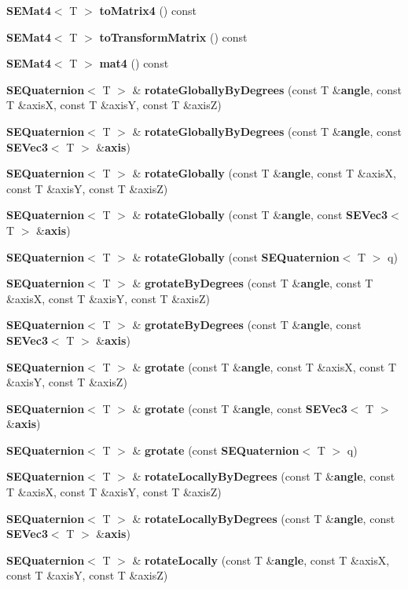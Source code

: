 \begin{DoxyCompactItemize}
\item 
{\bf S\+E\+Mat4}$<$ T $>$ {\bf to\+Matrix4} () const 
\item 
{\bf S\+E\+Mat4}$<$ T $>$ {\bf to\+Transform\+Matrix} () const 
\item 
{\bf S\+E\+Mat4}$<$ T $>$ {\bf mat4} () const 
\item 
{\bf S\+E\+Quaternion}$<$ T $>$ \& {\bf rotate\+Globally\+By\+Degrees} (const T \&{\bf angle}, const T \&axis\+X, const T \&axis\+Y, const T \&axis\+Z)
\item 
{\bf S\+E\+Quaternion}$<$ T $>$ \& {\bf rotate\+Globally\+By\+Degrees} (const T \&{\bf angle}, const {\bf S\+E\+Vec3}$<$ T $>$ \&{\bf axis})
\item 
{\bf S\+E\+Quaternion}$<$ T $>$ \& {\bf rotate\+Globally} (const T \&{\bf angle}, const T \&axis\+X, const T \&axis\+Y, const T \&axis\+Z)
\item 
{\bf S\+E\+Quaternion}$<$ T $>$ \& {\bf rotate\+Globally} (const T \&{\bf angle}, const {\bf S\+E\+Vec3}$<$ T $>$ \&{\bf axis})
\item 
{\bf S\+E\+Quaternion}$<$ T $>$ \& {\bf rotate\+Globally} (const {\bf S\+E\+Quaternion}$<$ T $>$ q)
\item 
{\bf S\+E\+Quaternion}$<$ T $>$ \& {\bf grotate\+By\+Degrees} (const T \&{\bf angle}, const T \&axis\+X, const T \&axis\+Y, const T \&axis\+Z)
\item 
{\bf S\+E\+Quaternion}$<$ T $>$ \& {\bf grotate\+By\+Degrees} (const T \&{\bf angle}, const {\bf S\+E\+Vec3}$<$ T $>$ \&{\bf axis})
\item 
{\bf S\+E\+Quaternion}$<$ T $>$ \& {\bf grotate} (const T \&{\bf angle}, const T \&axis\+X, const T \&axis\+Y, const T \&axis\+Z)
\item 
{\bf S\+E\+Quaternion}$<$ T $>$ \& {\bf grotate} (const T \&{\bf angle}, const {\bf S\+E\+Vec3}$<$ T $>$ \&{\bf axis})
\item 
{\bf S\+E\+Quaternion}$<$ T $>$ \& {\bf grotate} (const {\bf S\+E\+Quaternion}$<$ T $>$ q)
\item 
{\bf S\+E\+Quaternion}$<$ T $>$ \& {\bf rotate\+Locally\+By\+Degrees} (const T \&{\bf angle}, const T \&axis\+X, const T \&axis\+Y, const T \&axis\+Z)
\item 
{\bf S\+E\+Quaternion}$<$ T $>$ \& {\bf rotate\+Locally\+By\+Degrees} (const T \&{\bf angle}, const {\bf S\+E\+Vec3}$<$ T $>$ \&{\bf axis})
\item 
{\bf S\+E\+Quaternion}$<$ T $>$ \& {\bf rotate\+Locally} (const T \&{\bf angle}, const T \&axis\+X, const T \&axis\+Y, const T \&axis\+Z)

\end{DoxyCompactItemize}
